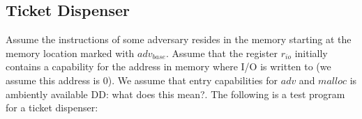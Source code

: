 \documentclass{article}
\newcommand\dominique[1]{{\color{purple} \sf \footnotesize {DD: #1}}}
\newcommand{\var}[1]{\mathit{#1}}
\newcommand{\hs}{\var{hs}}
\newcommand{\codelabel}[1]{\mathit{#1}}
\newcommand{\malloc}{\codelabel{malloc}}
\begin{document}
\subsection{Ticket Dispenser}
\label{sec:tick-disp}
\newcommand{\hsfoot}{\hs_\var{footprint}}
\newcommand{\hsframe}{\hs_\var{frame}}
\newcommand{\size}{\var{size}}
\newcommand{\rio}{r_{io}}
\newcommand{\adv}{\codelabel{adv}}
\newcommand{\advb}{\var{adv_{base}}}
\newcommand{\adve}{\var{adv_{end}}}
\newcommand{\initb}{\var{init}_{base}}
\newcommand{\inite}{\var{init}_{end}}
\newcommand{\mrlen}{5cm}
\newcommand{\retm}{\var{ret}_{\malloc}}
\newcommand{\reta}{\var{ret}_{\adv}}
\newcommand{\bracket}[1]{\multirow{#1}{*}{\ensuremath{
 \left . \vphantom{\begin{array}{l}
 \ifthenelse{\equal{#1}{1}}{3\\}{
    \ifthenelse{\equal{#1}{2}}{3\\3\\}{
    \ifthenelse{\equal{#1}{3}}{3\\3\\3\\}{
    \ifthenelse{\equal{#1}{4}}{3\\3\\3\\3\\}{
    \ifthenelse{\equal{#1}{5}}{3\\3\\3\\3\\3\\}{
    \ifthenelse{\equal{#1}{6}}{3\\3\\3\\3\\3\\3\\}{
      3\\3\\3\\3\\3\\3\\3\\ %
  }}}}}}
  \end{array}} \right \}}}
}
\newcommand{\annotate}[2]{\multirow{#1}{\mrlen}{\scriptsize #2}}
Assume the instructions of some adversary resides in the memory starting at the memory location marked with $\advb$. Assume that the register $\rio$ initially contains a capability for the address in memory where I/O is written to (we assume this address is 0). We assume that entry capabilities for $\adv$ and $\malloc$ is ambiently available\dominique{what does this mean?}. The following is a test program for a ticket dispenser:
\end{document}
